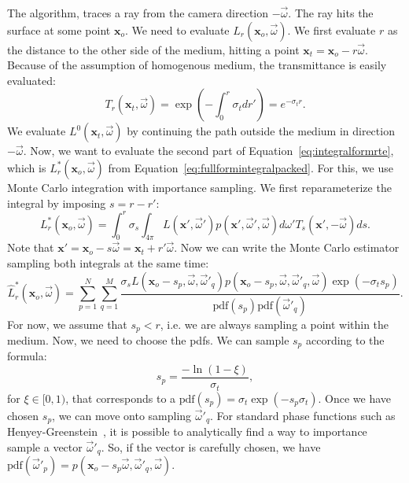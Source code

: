 The algorithm, traces a ray from the camera direction $-\vec{\omega}$. The ray hits the surface at some point $\mathbf{x}_o$. We need to evaluate $L_r(\mathbf{x}_o, \vec{\omega})$. We first evaluate $r$ as the distance to the other side of the medium, hitting a point $\mathbf{x}_t = \mathbf{x}_o - r \vec{\omega}$. Because of the assumption of homogenous medium, the transmittance is easily evaluated:
\begin{equation*}
T_r(\mathbf{x}_t, \vec{\omega}) = \exp\left(-\int_0^r \sigma_t dr'\right) = e^{-\sigma_t r}.
\end{equation*}
We evaluate $L^0(\mathbf{x}_t, \vec{\omega})$ by continuing the path outside the medium in direction $-\vec{\omega}$. Now, we want to evaluate the second part of Equation~\ref{eq:integralformrte}, which is $L_r^*(\mathbf{x}_o, \vec{\omega})$ from Equation~\ref{eq:fullformintegralpacked}. For this, we use Monte Carlo integration with importance sampling. We first reparameterize the integral by imposing $s = r - r'$:
\begin{equation*}
L_r^*(\mathbf{x}_o, \vec{\omega}) = \int_0^r \sigma_s \int_{4\pi} L(\mathbf{x}', \vec{\omega}') p(\mathbf{x}', \vec{\omega}', \vec{\omega})  d\omega' T_{s}(\mathbf{x}', -\vec{\omega})  ds.
\end{equation*}
Note that $\mathbf{x}' = \mathbf{x}_o - s \vec{\omega} = \mathbf{x}_t + r' \vec{\omega}$. Now we can write the Monte Carlo estimator sampling both integrals at the same time:
\begin{equation}
\label{eq:lrintermediate}
\hat{L}_r^*(\mathbf{x}_o, \vec{\omega}) = \sum_{p=1}^N\sum_{q=1}^M \frac{\sigma_s L(\mathbf{x}_o - s_p, \vec{\omega}, \vec{\omega}'_q) p(\mathbf{x}_o - s_p, \vec{\omega}, \vec{\omega}'_q, \vec{\omega}) \exp(-\sigma_t s_p)}{\text{pdf}(s_p) \text{pdf}(\vec{\omega}'_q)}.
\end{equation}
For now, we assume that $s_p < r$, i.e. we are always sampling a point within the medium. Now, we need to choose the pdfs.  We can sample $s_p$ according to the formula:
\begin{equation*}
s_p = \frac{-\ln(1 - \xi)}{\sigma_t},
\end{equation*}
for $\xi \in [0,1)$, that corresponds to a $\text{pdf}(s_p) = \sigma_t \exp(-s_p \sigma_t)$. Once we have chosen $s_p$, we can move onto sampling $\vec{\omega}'_q$. For standard phase functions such as Henyey-Greenstein~\cite{Henyey1940}, it is possible to analytically find a way to importance sample a vector $\vec{\omega}'_q$. So, if the vector is carefully chosen, we have $\text{pdf}(\vec{\omega}'_p) = p(\mathbf{x}_o - s_p \vec{\omega}, \vec{\omega}'_q, \vec{\omega})$.

